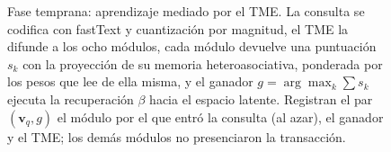 \begin{figure}[H]
{%
}
\caption[Fase temprana: aprendizaje mediado por el TME]{Fase temprana: aprendizaje mediado por el TME.
La consulta se codifica con fastText y cuantización por magnitud, el TME la difunde a
los ocho módulos, cada módulo devuelve una puntuación $s_k$ con la proyección de su
memoria heteroasociativa, ponderada por los pesos que lee de ella misma, y el ganador
$g = \arg\max_k \sum s_k$ ejecuta la recuperación $\beta$ hacia el espacio latente.
Registran el par $(\mathbf{v}_q, g)$ el módulo por el que entró la consulta (al azar),
el ganador y el TME; los demás módulos no presenciaron la transacción.}
\label{fig:arq-temprana}
\end{figure}

